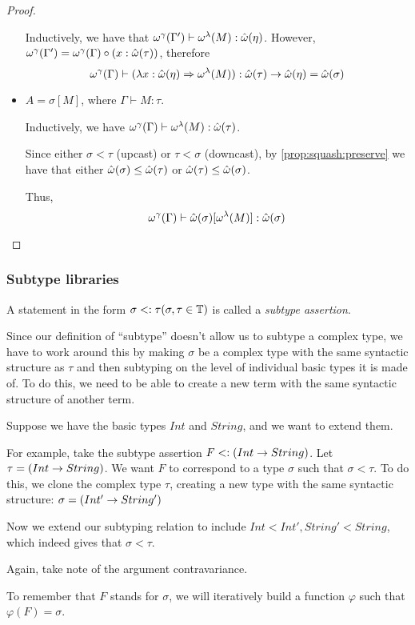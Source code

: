 \documentclass[main.tex]{subfiles}
\begin{document}
\begin{proof}
\begin{itemize}
            Inductively, we have that $\omega^{\gamma}(\Gamma') \vdash \omega^{\lambda}(M) : \hat{\omega}(\eta)$.
            However, $\omega^{\gamma}(\Gamma') = \omega^{\gamma}(\Gamma) \circ (x : \hat{\omega}(\tau))$,
            therefore \[ \omega^{\gamma}(\Gamma) \vdash (\lambda x : \hat{\omega}(\eta)
                \Rightarrow \omega^{\lambda}(M)) : \hat{\omega}(\tau) \rightarrow \hat{\omega}(\eta) = \hat{\omega}(\sigma) \]

        \item $A = \sigma[M]$, where $\Gamma \vdash M : \tau$.

            Inductively, we have $\omega^{\gamma}(\Gamma) \vdash \omega^{\lambda}(M) : \hat{\omega}(\tau)$.

            Since either $\sigma \less \tau$ (upcast) or $\tau \less \sigma$
            (downcast), by \cref{prop:squash:preserve} we have that either
            $\hat{\omega}(\sigma) \leq \hat{\omega}(\tau)$ or $\hat{\omega}(\tau) \leq \hat{\omega}(\sigma)$.

            Thus, \[
                \omega^{\gamma}(\Gamma) \vdash \hat{\omega}(\sigma)[\omega^{\lambda}(M)] : \hat{\omega}(\sigma)
            \]
    \end{itemize}
\end{proof}

\subsubsection{Subtype libraries}
\begin{defn}
    A statement in the form $\sigma <: \tau (\sigma, \tau \in \mathbb{T})$
    is called a \emph{subtype assertion}.
\end{defn}

Since our definition of ``subtype'' doesn't allow us to subtype a complex type,
we have to work around this by making $\sigma$ be a complex type with the same
syntactic structure as $\tau$ and then subtyping on the level of individual
basic types it is made of. To do this, we need to be able to create a new term
with the same syntactic structure of another term.

\begin{example}
    Suppose we have the basic types $Int$ and $String$, and we want to extend
    them.

    For example, take the subtype assertion $F <: ( Int \rightarrow String )$.
    Let $\tau = ( Int \rightarrow String )$. We want $F$ to correspond to a type
    $\sigma$ such that $\sigma \less \tau$. To do this, we clone
    the complex type $\tau$, creating a new type with the same
    syntactic structure: $\sigma = ( Int' \rightarrow String' )$

    Now we extend our subtyping relation to include $ Int \less Int', String' \less String $,
    which indeed gives that $\sigma \less \tau$.

    Again, take note of the argument contravariance.

    To remember that $F$ stands for $\sigma$, we will iteratively build a
    function $\varphi$ such that $\varphi(F) = \sigma$.
\end{example}
\end{document}
